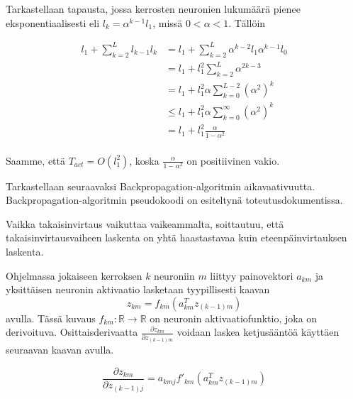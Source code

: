\documentclass[11pt]{article}
\begin{document}
Tarkastellaan tapausta, jossa kerrosten neuronien lukumäärä pienee eksponentiaalisesti eli $l_k = \alpha ^ {k - 1} l_1$, missä $0 < \alpha < 1$.
Tällöin 

\begin{equation*}
\begin{aligned} 
l_1  + \sum_{k = 2}^{L}l_{k-1} l_k &= l_1  + \sum_{k = 2}^{L}\alpha^{k-2} l_1 \alpha^{k - 1} l_0 \\
&= l_1 + l_1^2\sum_{k = 2}^{L}\alpha^{2k-3} \\
&= l_1 + l_1^2\alpha\sum_{k = 0}^{L - 2}(\alpha^2)^{k} \\
&\leq l_1 + l_1^2\alpha\sum_{k = 0}^{\infty}(\alpha^2)^{k} \\
&= l_1 + l_1^2\frac{\alpha}{1 - \alpha^2} \\
\end{aligned}
\end{equation*}

Saamme, että $T_{act} = O(l_1^2)$, koska $\frac{\alpha}{1 - \alpha^2}$ on positiivinen vakio.


Tarkastellaan seuraavaksi Backpropagation-algoritmin aikavaativuutta. Backpropagation-algoritmin pseudokoodi on esiteltynä toteutusdokumentissa.

Vaikka takaisinvirtaus vaikuttaa vaikeammalta, soittautuu, että takaisinvirtausvaiheen laskenta on yhtä haastastavaa kuin eteenpäinvirtauksen laskenta.

Ohjelmassa jokaiseen kerroksen $k$ neuroniin $m$ liittyy painovektori $a_{km}$ ja yksittäisen neuronin aktivaatio lasketaan tyypillisesti kaavan
\begin{equation*}
z_{km} = f_{km}(a_{km}^Tz_{(k - 1)m}) 
\end{equation*}
avulla. Tässä kuvaus $f_{km} : \mathbb{R} \to \mathbb{R} $ on neuronin aktivaatiofunktio, joka on derivoituva. Osittaisderivaatta $\frac{\partial z_{km}}{\partial z_{(k - 1)m}}$ voidaan laskea ketjusääntöä käyttäen seuraavan kaavan avulla.

\begin{equation*}
\frac{\partial z_{km}}{\partial z_{(k - 1)j}} =a_{kmj} f'_{km}(a_{km}^Tz_{(k - 1)m})
\end{equation*}
\end{document}
